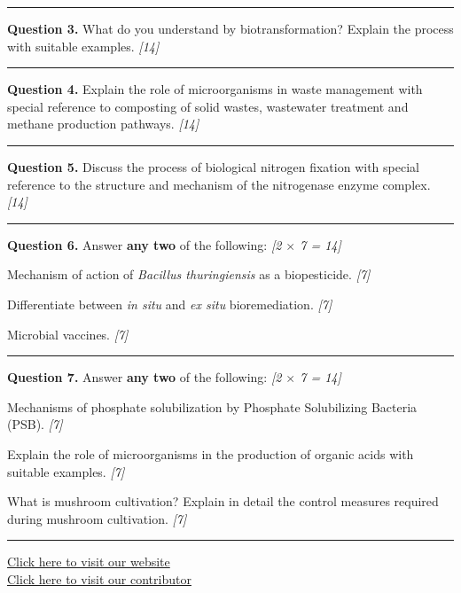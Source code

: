 \documentclass[11pt,a4paper]{article}
\newcommand{\pts}[1]{\hfill \textit{[#1]}}
\begin{document}
\medskip\rule{\linewidth}{0.2pt}\medskip

\noindent \textbf{Question 3.} What do you understand by biotransformation? Explain the process with suitable examples. \pts{14}

\medskip\rule{\linewidth}{0.2pt}\medskip

\noindent \textbf{Question 4.} Explain the role of microorganisms in waste management with special reference to composting of solid wastes, wastewater treatment and methane production pathways. \pts{14}

\medskip\rule{\linewidth}{0.2pt}\medskip

\noindent \textbf{Question 5.} Discuss the process of biological nitrogen fixation with special reference to the structure and mechanism of the nitrogenase enzyme complex. \pts{14}

\medskip\rule{\linewidth}{0.2pt}\medskip

\noindent \textbf{Question 6.} Answer \textbf{any two} of the following: \pts{2 $\times$ 7 = 14}
\begin{parts}
  \item Mechanism of action of \textit{Bacillus thuringiensis} as a biopesticide. \pts{7}
  \item Differentiate between \textit{in situ} and \textit{ex situ} bioremediation. \pts{7}
  \item Microbial vaccines. \pts{7}
\end{parts}

\medskip\rule{\linewidth}{0.2pt}\medskip

\noindent \textbf{Question 7.} Answer \textbf{any two} of the following: \pts{2 $\times$ 7 = 14}
\begin{parts}
  \item Mechanisms of phosphate solubilization by Phosphate Solubilizing Bacteria (PSB). \pts{7}
  \item Explain the role of microorganisms in the production of organic acids with suitable examples. \pts{7}
  \item What is mushroom cultivation? Explain in detail the control measures required during mushroom cultivation. \pts{7}
\end{parts}

\vfill
\rule{\linewidth}{0.4pt}

\begin{center}\small
\href{https://bhu-exam.vercel.app/}{Click here to visit our website}\\[4pt]
\href{https://me-aryan.vercel.app/}{Click here to visit our contributor}
\end{center}
\end{document}

